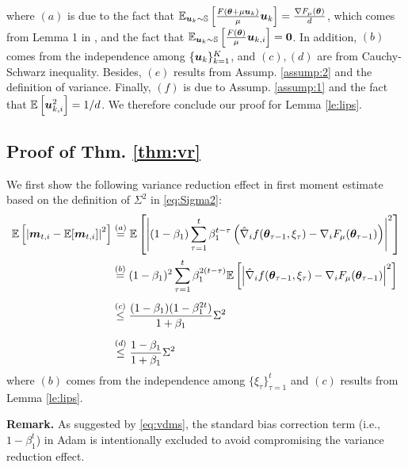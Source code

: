 \begin{appendices}
\begin{equation}
\end{equation}
where $(a)$ is due to the fact that $\mathbb{E}_{{\bm{u}}_k \sim {\mathbb{S}}}\left[\frac{F({\bm{\theta}} + \mu {\bm{u}}_k)}{\mu} {\bm{u}}_k\right] = \frac{\nabla F_{\mu}({\bm{\theta}})}{d}$, which comes from Lemma 1 in \citep{flaxman2004online}, and the fact that $\mathbb{E}_{{\bm{u}}_k \sim {\mathbb{S}}}\left[\frac{F({\bm{\theta}})}{\mu}{\bm{u}}_{k,i}\right] = {\bm{0}}$. In addition, $(b)$ comes from the independence among $\{{\bm{u}}_k\}_{k=1}^K$, and $(c), (d)$ are from Cauchy-Schwarz inequality. Besides, $(e)$ results from Assump. \ref{assump:2} and the definition of variance. Finally, $(f)$ is due to Assump. \ref{assump:1} and the fact that $\mathbb{E}\left[{\bm{u}}_{k,i}^2\right] = 1/d$. We therefore conclude our proof for Lemma \ref{le:lips}.

\subsection{Proof of Thm. \ref{thm:vr}}\label{proof:vr}

We first show the following variance reduction effect in first moment estimate based on the definition of $\Sigma^2$ in \eqref{eq:Sigma2}:
\begin{equation} \label{eq:vdms}
\begin{aligned}
\mathbb{E}\left[\left|{\bm{m}}_{t,i} - \mathbb{E}[{\bm{m}}_{t,i}]\right|^2\right] &\stackrel{(a)}{=} \mathbb{E}\left[\left|(1-\beta_1)\sum_{\tau=1}^{t}\beta_1^{t-\tau}\left(\hat{\nabla}_{i} f({\bm{\theta}}_{\tau-1}, \xi_{\tau}) - \nabla_{i} F_{\mu}({\bm{\theta}}_{\tau-1})\right)\right|^2\right] \\
&\stackrel{(b)}{=} (1-\beta_1)^2\sum_{\tau=1}^{t}\beta_1^{2(t-\tau)}\mathbb{E}\left[\left|\hat{\nabla}_{i} f({\bm{\theta}}_{\tau-1}, \xi_{\tau}) - \nabla_{i} F_{\mu}({\bm{\theta}}_{\tau-1})\right|^2\right] \\[4pt]
&\stackrel{(c)}{\leq} \frac{(1-\beta_1)(1-\beta_1^{2t})}{1 + \beta_1} \Sigma^2 \\[5pt]
&\stackrel{(d)}{\leq} \frac{1-\beta_1}{1 + \beta_1} \Sigma^2
\end{aligned}
\end{equation}
where $(b)$ comes from the independence among $\{\xi_{\tau}\}_{\tau=1}^t$ and $(c)$ results from Lemma \ref{le:lips}.

\textbf{Remark.} As suggested by \eqref{eq:vdms}, the standard bias correction term (i.e., $1-\beta_1^t$) in Adam \citep{adam} is intentionally excluded to avoid compromising the variance reduction effect.



\end{appendices}

